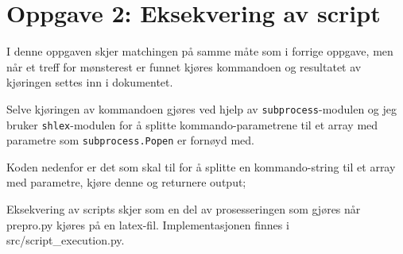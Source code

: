 \section*{Oppgave 2: Eksekvering av script}

I denne oppgaven skjer matchingen på samme måte som i forrige oppgave, men når et treff for mønsterest er funnet kjøres kommandoen og resultatet av kjøringen settes inn i dokumentet.

Selve kjøringen av kommandoen gjøres ved hjelp av \verb;subprocess;-modulen og jeg bruker \verb;shlex;-modulen for å splitte kommando-parametrene til et array med parametre som \verb;subprocess.Popen; er fornøyd med.

Koden nedenfor er det som skal til for å splitte en kommando-string til et array med parametre, kjøre denne og returnere output;


Eksekvering av scripts skjer som en del av prosesseringen som gjøres når prepro.py kjøres på en latex-fil. Implementasjonen finnes i src/script\_execution.py.